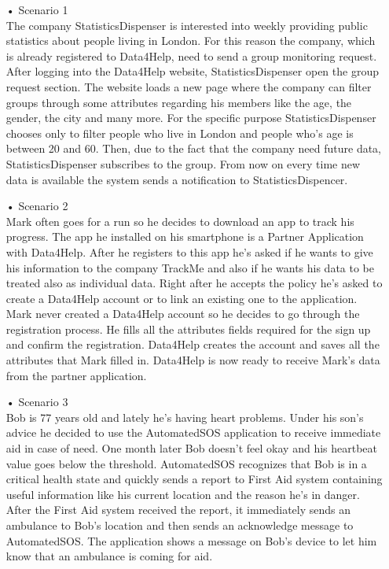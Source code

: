 \begin{enumerate}
\item[•]{\Large Scenario 1} \\
The company StatisticsDispenser is interested into weekly providing public statistics about people living in London. For this reason the company, which is already registered to Data4Help, need to send a group monitoring request. After logging into the Data4Help website, StatisticsDispenser open the group request section. The website loads a new page where the company can filter groups through some attributes regarding his members like the age, the gender, the city and many more. For the specific purpose StatisticsDispenser chooses only to filter people who live in London and people who's age is between 20 and 60. Then, due to the fact that the company need future data, StatisticsDispenser subscribes to the group. From now on every time new data is available the system sends a notification to StatisticsDispencer. 
\item[•]{\Large Scenario 2} \\
Mark often goes for a run so he decides to download an app to track his progress. The app he installed on his smartphone is a Partner Application with Data4Help. After he registers to this app he's asked if he wants to give his information to the company TrackMe and also if he wants his data to be treated also as individual data. Right after he accepts the policy he's asked to create a Data4Help account or to link an existing one to the application. Mark never created a Data4Help account so he decides to go through the registration process. He fills all the attributes fields required for the sign up and confirm the registration. Data4Help creates the account and saves all the attributes that Mark filled in. Data4Help is now ready to receive Mark's data from the partner application.
\item[•]{\Large Scenario 3} \\
Bob is 77 years old and lately he's having heart problems. Under his son's advice he decided to use the AutomatedSOS application to receive immediate aid in case of need. One month later Bob doesn't feel okay and his heartbeat value goes below the threshold. AutomatedSOS recognizes that Bob is in a critical health state and quickly sends a report to First Aid system containing useful information like his current location and the reason he's in danger. After the First Aid system received the report, it immediately sends an ambulance to Bob's location and then sends an acknowledge message to AutomatedSOS. The application shows a message on Bob's device to let him know that an ambulance is coming for aid.

\end{enumerate}
